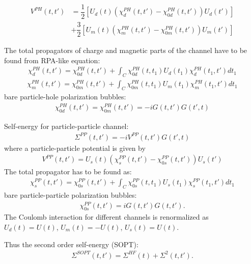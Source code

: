 \begin{align}
\label{Vph_single_band}
V^{PH}(t,t')
&=\dfrac{1}{2}\left[ U_d(t) \left( \chi_d^{PH}(t,t')-\chi_{0d}^{PH}(t,t') \right) U_d(t') \right] 
\nonumber
		\\
&+ \dfrac{3}{2} \left[ U_m(t) \left( \chi_m^{PH}(t,t')-\chi_{0m}^{PH}(t,t') \right) U_m(t') \right]
\end{align}


The total propagators of charge and magnetic parts of the channel have to be found from RPA-like equation:
\begin{align}
\label{chiph_d_single_band}
\chi^{PH}_d(t,t')=\chi^{PH}_{0d}(t,t')+\int_C \chi^{PH}_{0d}(t,t_1) U_d(t_1) \chi^{PH}_d(t_1,t') dt_1
\end{align}
\begin{align}
\label{chiph_m_single_band}
\chi^{PH}_m(t,t')=\chi^{PH}_{0m}(t,t')+\int_C \chi^{PH}_{0m}(t,t_1) U_m(t_1) \chi^{PH}_m(t_1,t') dt_1
\end{align}
bare particle-hole polarization bubbles:
\begin{align}
\label{chiph_0_single_band}
\chi^{PH}_{0d}(t,t')=\chi^{PH}_{0m}(t,t')=-iG(t,t')G(t',t)
\end{align}

{Self-energy for particle-particle channel}:
\begin{align}
\label{Spp_single_band}
\Sigma^{PP}(t,t')=-iV^{PP}(t,t')G(t',t)
\end{align}
where a particle-particle potential is given by
\begin{align}
\label{Vpp_single_band}
V^{PP}(t,t')= U_s(t) \left( \chi_s^{PP}(t,t')-\chi_{0s}^{PP}(t,t') \right) U_s(t') 
\end{align}
The total propagator has to be found as:
\begin{align}
\label{chipp_s_single_band}
\chi^{PP}_s(t,t')=\chi^{PP}_{0s}(t,t')+\int_C \chi^{PP}_{0s}(t,t_1) U_s(t_1) \chi^{PP}_s(t_1,t') dt_1
\end{align}
bare particle-particle polarization bubbles:
\begin{align}
\label{chipp_0_single_band}
\chi^{PP}_{0s}(t,t')=iG(t,t')G(t,t').
\end{align}
The Coulomb interaction for different channels is renormalized as
$U_d(t)=U(t)$, $U_m(t)=-U(t)$, $U_s(t)=U(t)$.

Thus the second order self-energy (SOPT):
\begin{align}
\label{S_so_single_band}
\Sigma^{SOPT}(t,t')=\Sigma^{HF}(t)+\Sigma^{2}(t,t').
\end{align}

